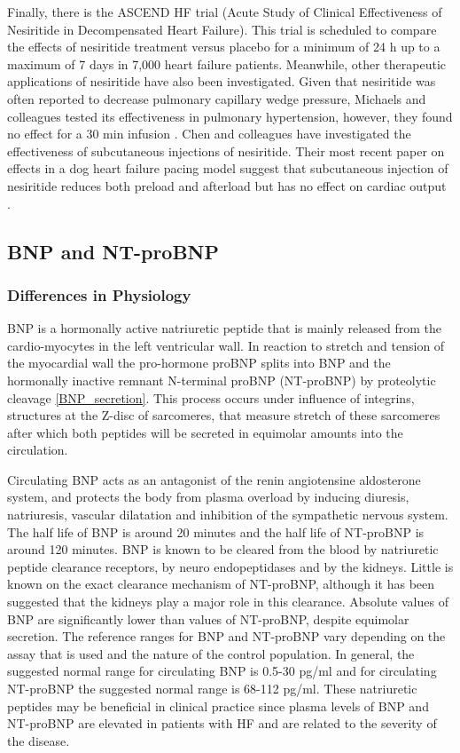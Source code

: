 \documentclass[14pt,a4paper,onecolumn]{extarticle}
\begin{document}
Finally, there is the ASCEND HF trial (Acute Study of Clinical Effectiveness of Nesiritide in Decompensated Heart Failure). This trial is scheduled to compare the effects of nesiritide treatment versus placebo for a minimum of 24 h up to a maximum of 7 days in 7,000 heart failure patients. Meanwhile, other therapeutic applications of nesiritide have also been investigated. Given that nesiritide was often reported to decrease pulmonary capillary wedge pressure, Michaels and colleagues tested its effectiveness in pulmonary hypertension, however, they found no effect for a 30 min infusion \citep{Michaels2005}. Chen and colleagues have investigated the effectiveness of subcutaneous injections of nesiritide. Their most recent paper on effects in a dog heart failure pacing model suggest that subcutaneous injection of nesiritide reduces both preload and afterload but has no effect on cardiac output \citep{Chen2006}.

\subsection{BNP and NT-proBNP}
\subsubsection{Differences in Physiology}
BNP is a hormonally active natriuretic peptide that is mainly released from the cardio-myocytes in the left ventricular wall. In reaction to stretch and tension of the myocardial wall the pro-hormone proBNP splits into BNP and the hormonally inactive remnant N-terminal proBNP (NT-proBNP) by proteolytic cleavage \ref{BNP_secretion}. \citep{Pfister2004} This process occurs under influence of integrins, structures at the Z-disc of sarcomeres, that measure stretch of these sarcomeres \citep{Liang2000,Pyle2004} after which both peptides will be secreted in equimolar amounts into the circulation.

Circulating BNP acts as an antagonist of the renin angiotensine aldosterone system, and protects the body from plasma overload by inducing diuresis, natriuresis, vascular dilatation and inhibition of the sympathetic nervous system. \citep{Sudoh1988} The half life of BNP is around 20 minutes and the half life of NT-proBNP is around 120 minutes. BNP is known to be cleared from the blood by natriuretic peptide clearance receptors, by neuro endopeptidases and by the kidneys. Little is known on the exact clearance mechanism of NT-proBNP, although it has been suggested that the kidneys play a major role in this clearance. \citep{Hall2005}
Absolute values of BNP are significantly lower than values of NT-proBNP, despite equimolar secretion. The reference ranges for BNP and NT-proBNP vary depending on the assay that is used and the nature of the control population. In general, the suggested normal range for circulating BNP is 0.5-30 pg/ml and for circulating NT-proBNP the suggested normal range is 68-112 pg/ml. \citep{Cowie2003} These natriuretic peptides may be beneficial in clinical practice since plasma levels of BNP and NT-proBNP are elevated in patients with HF and are related to the severity of the disease. \citep{Mukoyama1990}
\end{document}
